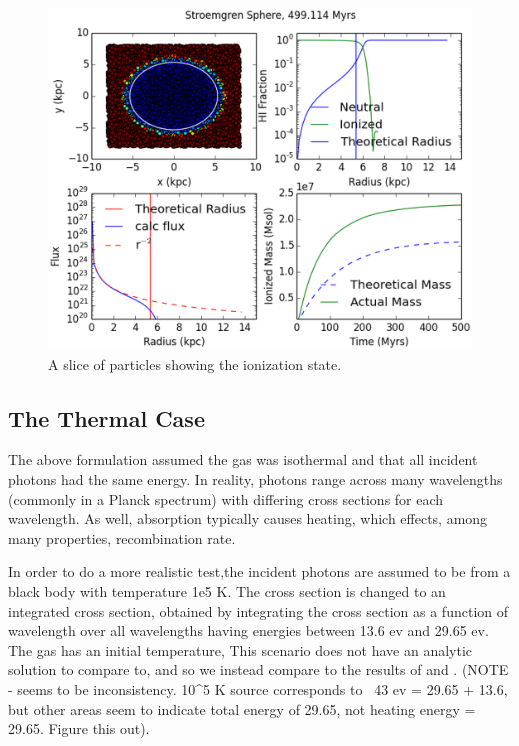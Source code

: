 \begin{figure}
\includegraphics[width=\textwidth]{graphics/ifront6401000.eps}
\caption[The isothermal Str\"omgren Sphere.]{A slice of particles showing the ionization state.}
\label{fig:stromgreniso}
\end{figure}

\subsection{The Thermal Case}
\label{sec:thermalstromgren}

The above formulation assumed the gas was isothermal and that all incident photons had the same energy. In reality, photons range across many wavelengths (commonly in a Planck spectrum) with differing cross sections for each wavelength. As well, absorption typically causes heating, which effects, among many properties, recombination rate.

In order to do a more realistic test,the incident photons are assumed to be from a black body with temperature 1e5 K. The cross section is changed to an integrated cross section, obtained by integrating the cross section as a function of wavelength over all wavelengths having energies between 13.6 ev and 29.65 ev. The gas has an initial temperature, This scenario does not have an analytic solution to compare to, and so we instead compare to the results of \citet{ilievEt06} and \citet{petkovaSpringel09}. (NOTE - seems to be inconsistency. 10^5 K source corresponds to ~43 ev = 29.65 + 13.6, but other areas seem to indicate total energy of 29.65, not heating energy = 29.65. Figure this out).

